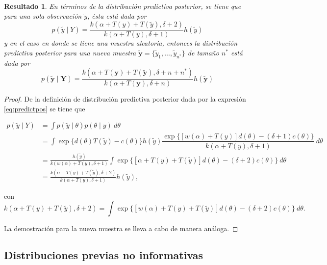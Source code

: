 \documentclass[
  10pt,
  spanish,
]{book}
\newtheorem{proposition}{Resultado}[chapter]
\theoremstyle{definition}
\theoremstyle{definition}
\theoremstyle{definition}
\theoremstyle{definition}
\theoremstyle{remark}
\begin{document}
\begin{proposition}
\protect\hypertarget{prp:unnamed-chunk-13}{}{\label{prp:unnamed-chunk-13} }En términos de la distribución predictiva posterior, se tiene que para una sola observación \(\tilde{y}\), ésta está dada por
\begin{equation}
p(\tilde{y} \mid Y)=\frac{k(\alpha+T(y)+T(\tilde{y}),\delta+2)}{k(\alpha+T(y),\delta+1)}h(\tilde{y})
\end{equation}
y en el caso en donde se tiene una muestra aleatoria, entonces la distribución predictiva posterior para una nueva muestra \(\tilde{\mathbf{y}}=\{\tilde{y}_1,\ldots,\tilde{y}_{n^*}\}\) de tamaño \(n^*\) está dada por
\begin{equation}
p(\tilde{\mathbf{y}} \mid \mathbf{Y})=
\frac{k(\alpha+T(\mathbf{y})+T(\tilde{\mathbf{y}}),\delta+n+n^*)}
{k(\alpha+T(\mathbf{y}),\delta+n)}h(\tilde{\mathbf{y}})
\end{equation}
\end{proposition}

\begin{proof}
{}De la definición de distribución predictiva posterior dada por la expresión \eqref{eq:predictpos} se tiene que

\begin{align*}
p(\tilde{y} \mid Y)&=\int p(\tilde{y} \mid \theta)p(\theta \mid y)\ d\theta\\
&=\int \exp\{d(\theta)T(\tilde{y})-c(\theta)\}h(\tilde{y})\dfrac{\exp\{[w(\alpha)+T(y)]d(\theta)-(\delta+1)c(\theta)\}}{k(\alpha+T(y),\delta+1)}\ d\theta\\
&=\frac{h(\tilde{y})}{k(w(\alpha)+T(y),\delta+1)}\int \exp\{[\alpha+T(y)+T(\tilde{y})]d(\theta)-(\delta+2)c(\theta)\}\ d\theta\\
&=\frac{k(\alpha+T(y)+T(\tilde{y}),\delta+2)}{k(\alpha+T(y),\delta+1)}h(\tilde{y}),
\end{align*}

con
\begin{equation*}
k(\alpha+T(y)+T(\tilde{y}),\delta+2)=\int \exp\{[w(\alpha)+T(y)+T(\tilde{y})]d(\theta)-(\delta+2)c(\theta)\}\ d\theta.
\end{equation*}

La demostración para la nueva muestra se lleva a cabo de manera análoga.
\end{proof}

\hypertarget{distribuciones-previas-no-informativas}{%
\subsection{Distribuciones previas no informativas}\label{distribuciones-previas-no-informativas}}
\end{document}
